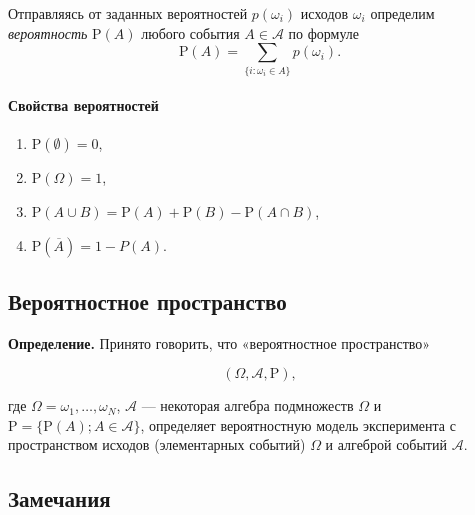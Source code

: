 \documentclass[11pt,a4paper]{article}
\providecommand{\tightlist}{%
      \setlength{\itemsep}{0pt}\setlength{\parskip}{0pt}}
\begin{document}
Отправляясь от заданных вероятностей \(p(\omega_i)\) исходов
\(\omega_i\) определим \emph{вероятность} \(\mathrm{P}(A)\) любого
события \(A \in \mathcal{A}\) по формуле
\[ \mathrm{P}(A) = \sum_{\{i:\omega_i \in A\}} p(\omega_i). \]

\hypertarget{ux441ux432ux43eux439ux441ux442ux432ux430-ux432ux435ux440ux43eux44fux442ux43dux43eux441ux442ux435ux439}{%
\paragraph{Свойства
вероятностей}\label{ux441ux432ux43eux439ux441ux442ux432ux430-ux432ux435ux440ux43eux44fux442ux43dux43eux441ux442ux435ux439}}

\begin{enumerate}
\def\labelenumi{\arabic{enumi}.}
\tightlist
\item
  \(\mathrm{P}(\emptyset) = 0\),
\item
  \(\mathrm{P}(\Omega) = 1\),
\item
  \(\mathrm{P}(A \cup B) = \mathrm{P}(A) + \mathrm{P}(B) - \mathrm{P}(A \cap B)\),
\item
  \(\mathrm{P}(\overline{A}) = 1 - P(A)\).
\end{enumerate}

    \hypertarget{ux432ux435ux440ux43eux44fux442ux43dux43eux441ux442ux43dux43eux435-ux43fux440ux43eux441ux442ux440ux430ux43dux441ux442ux432ux43e}{%
\subsection{Вероятностное
пространство}\label{ux432ux435ux440ux43eux44fux442ux43dux43eux441ux442ux43dux43eux435-ux43fux440ux43eux441ux442ux440ux430ux43dux441ux442ux432ux43e}}

\textbf{Определение.} Принято говорить, что «вероятностное пространство»

\[ \left( \Omega, \mathcal{A}, \mathrm{P} \right), \]

где \(\Omega = {\omega_1, \ldots, \omega_N}\), \(\mathcal{A}\) ---
некоторая алгебра подмножеств \(\Omega\) и
\(\mathrm{P} = \{ \mathrm{P}(A); A \in \mathcal{A} \}\), определяет
вероятностную модель эксперимента с пространством исходов (элементарных
событий) \(\Omega\) и алгеброй событий \(\mathcal{A}\).

    \hypertarget{ux437ux430ux43cux435ux447ux430ux43dux438ux44f}{%
\subsection{Замечания}\label{ux437ux430ux43cux435ux447ux430ux43dux438ux44f}}
\end{document}
